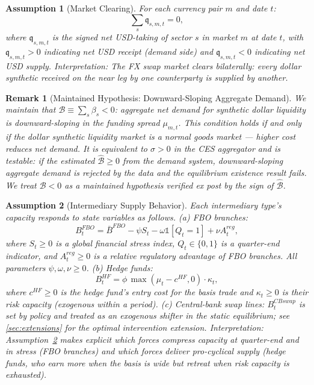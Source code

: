 \documentclass[12pt]{article}
\newtheorem{assumption}{Assumption}
\newtheorem{remark}{Remark}
\theoremstyle{definition}
\newcommand{\1}[1]{\mathds{1}\left[#1\right]}
\begin{document}
\begin{assumption}[Market Clearing]
  \label{ass:clearing}
  For each currency pair $m$ and date $t$:
  \begin{equation}
    \sum_{s} \mathfrak{q}_{s,m,t} = 0,
    \label{eq:clearing}
  \end{equation}
  where $\mathfrak{q}_{s,m,t}$ is the signed net USD-taking of sector $s$ in
  market $m$ at date $t$, with $\mathfrak{q}_{s,m,t} > 0$ indicating net USD
  receipt (demand side) and $\mathfrak{q}_{s,m,t} < 0$ indicating net USD
  supply. \emph{Interpretation:} The FX swap market clears bilaterally: every
  dollar synthetic received on the near leg by one counterparty is supplied by
  another.
\end{assumption}

\begin{remark}[Maintained Hypothesis: Downward-Sloping Aggregate Demand]
  \label{rem:B-negative}
  We maintain that $\mathcal{B} \equiv \sum_s \beta_s < 0$: aggregate net
  demand for synthetic dollar liquidity is downward-sloping in the funding
  spread $\mu_{m,t}$. This condition holds if and only if the dollar synthetic
  liquidity market is a normal goods market --- higher cost reduces net demand.
  It is equivalent to $\sigma > 0$ in the CES aggregator and is testable: if
  the estimated $\hat{\mathcal{B}} \geq 0$ from the demand system, downward-sloping
  aggregate demand is rejected by the data and the equilibrium existence result
  fails. We treat $\mathcal{B} < 0$ as a maintained hypothesis verified ex post
  by the sign of $\hat{\mathcal{B}}$.
\end{remark}

\begin{assumption}[Intermediary Supply Behavior]
  \label{ass:supply}
  Each intermediary type's capacity responds to state variables as follows.
  (a) FBO branches:
  \begin{equation}
    B_t^{FBO} = \bar{B}^{FBO} - \psi S_t - \omega \mathds{1}[Q_t = 1] + \nu A_t^{reg},
    \label{eq:FBO-capacity}
  \end{equation}
  where $S_t \geq 0$ is a global financial stress index, $Q_t \in \{0,1\}$ is
  a quarter-end indicator, and $A_t^{reg} \geq 0$ is a relative regulatory
  advantage of FBO branches. All parameters $\psi, \omega, \nu \geq 0$.
  (b) Hedge funds:
  \begin{equation}
    B_t^{HF} = \phi\,\max(\mu_t - c^{HF}, 0) \cdot \kappa_t,
    \label{eq:HF-capacity}
  \end{equation}
  where $c^{HF} \geq 0$ is the hedge fund's entry cost for the basis trade and
  $\kappa_t \geq 0$ is their risk capacity (exogenous within a period).
  (c) Central-bank swap lines: $B_t^{CBswap}$ is set by policy and treated as
  an exogenous shifter in the static equilibrium; see \cref{sec:extensions} for
  the optimal intervention extension.
  \emph{Interpretation:} Assumption~\ref{ass:supply} makes explicit which
  forces compress capacity at quarter-end and in stress (FBO branches) and which
  forces deliver pro-cyclical supply (hedge funds, who earn more when the basis
  is wide but retreat when risk capacity is exhausted).
\end{assumption}
\end{document}
